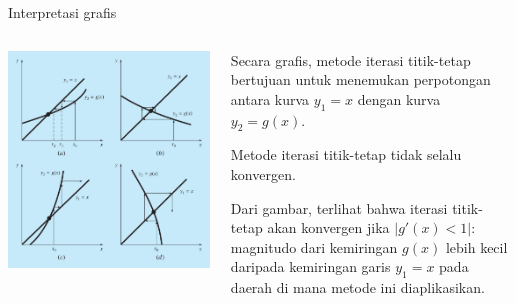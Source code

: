\begin{frame}{Interpretasi grafis}
\fontsize{10}{11}\selectfont

\begin{columns}

  \begin{column}{0.5\textwidth}
  {\centering
  \includegraphics[height=0.8\textheight]{../chapra_7th/Chapra_Fig_6_3.png}
  \par}
  \end{column}

  \begin{column}{0.5\textwidth}
  Secara grafis, metode iterasi titik-tetap bertujuan untuk
  menemukan perpotongan antara kurva $y_1 = x$ dengan
  kurva $y_2 = g(x)$.

  Metode iterasi titik-tetap tidak selalu konvergen.

  Dari gambar, terlihat bahwa iterasi titik-tetap akan konvergen jika
  $|g'(x) < 1|$: magnitudo dari kemiringan $g(x)$ lebih kecil daripada
  kemiringan garis $y_1 = x$ pada daerah di mana metode ini diaplikasikan.
  \end{column}
\end{columns}

\end{frame}


